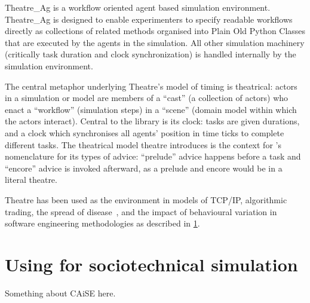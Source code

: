 \begin{blockquote}
Theatre\_Ag is a workflow oriented agent based simulation environment.
Theatre\_Ag is designed to enable experimenters to specify readable workflows
directly as collections of related methods organised into Plain Old Python
Classes that are executed by the agents in the simulation. All other simulation
machinery (critically task duration and clock synchronization) is handled
internally by the simulation environment.
\end{blockquote}

The central metaphor underlying Theatre's model of timing is theatrical: actors
in a simulation or model are members of a ``cast'' (a collection of actors) who
enact a ``workflow'' (simulation steps) in a ``scene'' (domain model within
which the actors interact). Central to the library is its clock: tasks are given
durations, and a clock which synchronises all agents' position in time ticks to
complete different tasks. The theatrical model theatre introduces is the context
for \pdsf{}'s nomenclature for its types of advice: ``prelude'' advice happens
before a task and ``encore'' advice is invoked afterward, as a prelude and
encore would be in a literal theatre.

Theatre has been used as the environment in models of TCP/IP, algorithmic
trading, the spread of disease~\cite{aranTheatreThesis}, and the impact of
behavioural variation in software engineering methodologies as described in
\cref{sec:caise_paper}.


\section{Using \pdsf for sociotechnical simulation}\label{sec:caise_paper}

Something about CAiSE here.
